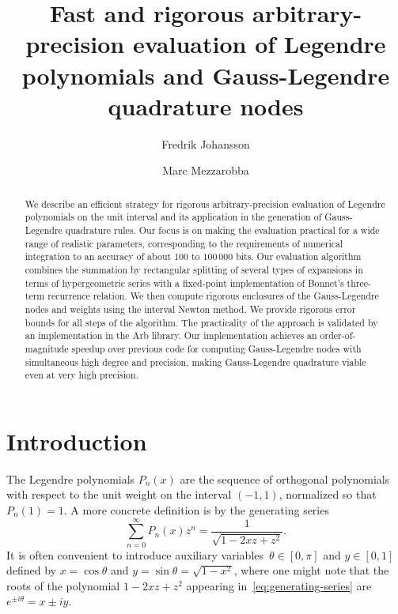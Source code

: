 \documentclass{siamart0216}
\begin{document}
\title{Fast and rigorous arbitrary-precision evaluation of Legendre
polynomials and Gauss-Legendre quadrature nodes}
\author{Fredrik Johansson \and Marc Mezzarobba}
\date{}
\maketitle

\begin{abstract}
We describe an efficient strategy for rigorous
arbitrary-precision evaluation of Legendre polynomials on the unit
interval and its application in the generation of Gauss-Legendre
quadrature rules.
Our focus is on making the evaluation practical for a wide range of
realistic parameters, corresponding to the requirements of numerical
integration to an accuracy of about $100$ to $100\,000$ bits.
Our evaluation algorithm combines the summation by rectangular
splitting of several types of expansions in terms of hypergeometric
series with a fixed-point implementation of Bonnet's three-term
recurrence relation.
We then compute rigorous enclosures of the Gauss-Legendre nodes and
weights using the interval Newton method.
We provide rigorous error bounds for all steps of the algorithm.
The practicality of the approach is validated by an implementation in
the Arb library.
Our implementation achieves an order-of-magnitude speedup over
previous code for computing Gauss-Legendre nodes with simultaneous
high degree and precision, making Gauss-Legendre quadrature viable
even at very high precision.
\end{abstract}

\section{Introduction}

The Legendre polynomials $P_n(x)$ are the sequence
of orthogonal polynomials with respect to the unit weight
on the interval $(-1,1)$, normalized so that $P_n(1) = 1$.
A more concrete definition is by the generating series
\begin{equation} \label{eq:generating-series}
  \sum_{n=0}^{\infty} P_n(x) z^n
  = \frac{1}{\sqrt{1 - 2 x z + z^2}}.
\end{equation}
It is often convenient to introduce auxiliary
variables~$\theta \in [0, \pi]$ and $y \in [0, 1]$ defined by
$x = \cos \theta$ and $y = \sin \theta = \sqrt{1 - x^2}$,
where one might note that the roots of the polynomial $1 - 2 x z + z^2$ appearing
in \eqref{eq:generating-series} are $e^{\pm i \theta} = x \pm i y$.
\end{document}
